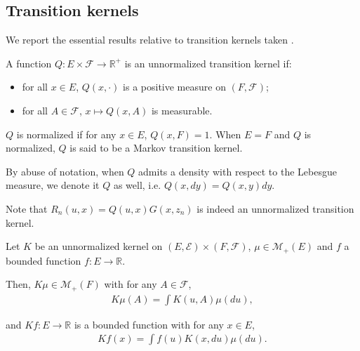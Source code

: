 \subsection{Transition kernels}
We report the essential results relative to transition kernels taken \cite{cappehmm}.
\begin{definition}\label{def:transition-kernel}
A function $Q:E \times \mathcal F \to \mathbb R^+$ is an unnormalized transition kernel if:
\begin{itemize}
    \item for all $x\in E$, $Q(x, \cdot)$ is a positive measure on $(F, \mathcal F)$;
    \item for all $A\in \mathcal F$, $x\mapsto Q(x, A)$ is measurable.
\end{itemize}
$Q$ is normalized if for any $x\in E$, $Q(x, F)=1$. When $E=F$ and $Q$ is normalized, $Q$ is said to be a Markov transition kernel.

By abuse of notation, when $Q$ admits a density with respect to the Lebesgue measure, we denote it $Q$ as well, i.e. $Q(x, dy)=Q(x, y)dy$.
\end{definition}

Note that $R_n(u, x)= Q(u, x)G(x, z_n)$ is indeed an unnormalized transition kernel.

\begin{definition}
    Let $K$ be an unnormalized kernel on $(E, \mathcal E)\times (F, \mathcal F)$, $\mu\in\mathcal M_+(E)$ and $f$ a bounded function $f:E\to\mathbb R$.

    Then, $K\mu\in\mathcal M_+(F)$ with for any $A\in\mathcal F$,
    \begin{align}
        K\mu(A) = \int K(u, A)\mu(du),
    \end{align}

    and $Kf: E \to \mathbb R$ is a bounded function with for any $x\in E$,
    \begin{align}
        Kf(x) = \int f(u)K(x, du)\mu(du).
    \end{align}
\end{definition}
